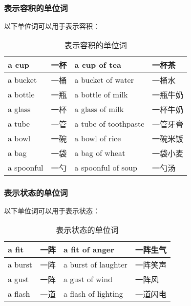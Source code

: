 \documentclass[UTF8]{ctexart}
\begin{document}
\newpage

\subsubsection{表示容积的单位词}
    以下单位词可以用于表示容积：
    \begin{table}[h]
        \begin{center}
            \ttfamily
            \begin{tabular}{p{70pt}|p{50pt}|p{150pt}|p{60pt}}
                \hline
                a cup&一杯&a cup of tea&一杯茶\\ \hline
                a bucket&一桶&a bucket of water&一桶水\\ \hline
                a bottle&一瓶&a bottle of milk&一瓶牛奶\\ \hline
                a glass&一杯&a glass of milk&一杯牛奶\\ \hline
                a tube&一管&a tube of toothpaste&一管牙膏\\ \hline
                a bowl&一碗&a bowl of rice&一碗米饭\\ \hline
                a bag&一袋&a bag of wheat&一袋小麦\\ \hline
                a spoonful&一勺&a spoonful of soup&一勺汤\\ \hline
            \end{tabular}
            \rmfamily
            \caption{表示容积的单位词}
        \end{center}
    \end{table}\vspace{-25pt}

\subsubsection{表示状态的单位词}
    以下单位词可以用于表示状态：
    \begin{table}[h]
        \begin{center}
            \ttfamily
            \begin{tabular}{p{70pt}|p{50pt}|p{150pt}|p{60pt}}
                \hline
                a fit&一阵&a fit of anger&一阵生气\\ \hline
                a burst&一阵&a burst of laughter&一阵笑声\\ \hline
                a gust&一阵&a gust of wind&一阵风\\ \hline
                a flash&一道&a flash of lighting&一道闪电\\ \hline
            \end{tabular}
            \rmfamily
            \caption{表示状态的单位词}
        \end{center}
    \end{table}\vspace{-25pt}
\end{document}
